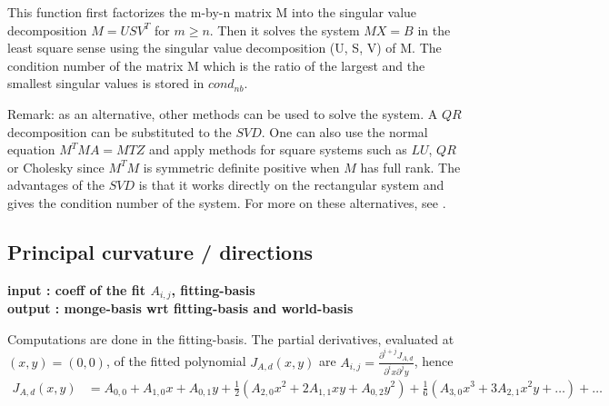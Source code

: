 This function first factorizes the m-by-n matrix M into the singular
value decomposition $M = U S V^T$ for $m \geq n$.  Then it solves the
system $MX = B$ in the least square sense using the singular value
decomposition (U, S, V) of M. The condition number of the matrix M
which is the ratio of the largest and the smallest singular values is
stored in $cond_{nb}$.

\medskip
Remark: as an alternative, other methods can be used to solve the
system. A $QR$ decomposition can be substituted to the $SVD$. One can
also use the normal equation $M^TMA=MTZ$ and apply methods for square
systems such as $LU$, $QR$ or Cholesky since $M^TM$ is symmetric
definite positive when $M$ has full rank. 
The advantages of the $SVD$
is that it works directly on the rectangular system and gives the
condition number of the system. For more on these alternatives, see
\cite{gl-mc-83}.

\subsection{Principal  curvature / directions}

{\bf input : coeff of the fit $A_{i,j}$, 
fitting-basis \\
output : monge-basis wrt fitting-basis and world-basis
}

Computations are done in the fitting-basis.  The partial derivatives,
evaluated at $(x,y)=(0,0)$, of the fitted polynomial $J_{A,d}(x,y)$ are
$A_{i,j}=\frac{\partial^{i+j}J_{A,d}}{\partial^ix
\partial^jy}$, hence
\begin{eqnarray}
J_{A,d}(x,y)&=
A_{0,0}+A_{1,0}x+A_{0,1}y+\frac{1}{2}(A_{2,0}x^2+2A_{1,1}xy+A_{0,2}y^2) 
+ \frac{1}{6}(A_{3,0}x^3+3A_{2,1}x^2y+\ldots )+ \ldots 
\end{eqnarray}


